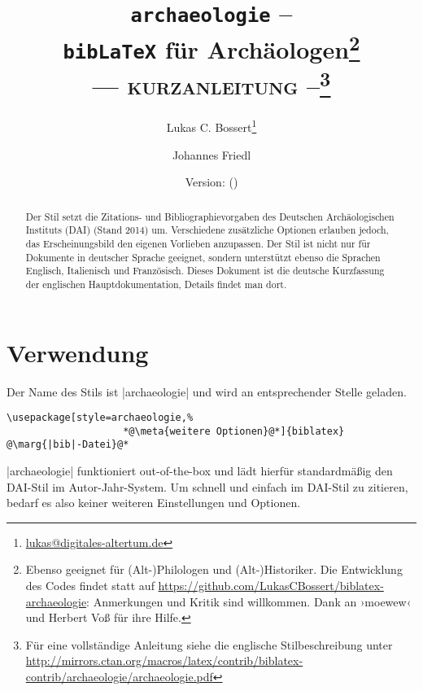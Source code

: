 \documentclass[a4paper,10pt,ngerman]{ltxdoc}
\begin{document}
 \title{\texttt{archaeologie} -- \\\texttt{bib\LaTeX} für Archäologen\footnote{Ebenso geeignet für (Alt-)Philologen und (Alt-)Historiker.
 Die Entwicklung des Codes findet statt auf \url{https://github.com/LukasCBossert/biblatex-archaeologie}: 
 Anmerkungen und Kritik sind willkommen.
 Dank an   ›moewew‹ und Herbert Voß für ihre Hilfe.
}\\ --- {\scshape kurzanleitung} --\footnote{Für eine vollständige Anleitung siehe die englische Stilbeschreibung unter \url{http://mirrors.ctan.org/macros/latex/contrib/biblatex-contrib/archaeologie/archaeologie.pdf}} }
\author{Lukas C. Bossert\thanks{\url{lukas@digitales-altertum.de}} \and Johannes Friedl}
\date{Version: \archaeologieversion{} (\archaeologiedate)} 
 
 \maketitle
 \begin{abstract}
\noindent Der Stil setzt die Zitations- und Bibliographievorgaben des Deutschen Archäologischen Instituts (DAI) (Stand 2014) um. Verschiedene zusätzliche Optionen erlauben jedoch, das Erscheinungsbild den eigenen Vorlieben anzupassen. Der Stil ist nicht nur für Dokumente in deutscher Sprache geeignet, sondern unterstützt ebenso die Sprachen Englisch, Italienisch und Französisch. Dieses Dokument ist die deutsche Kurzfassung der englischen Hauptdokumentation, Details findet man dort.

 \end{abstract}

	{\parskip=0mm \tableofcontents}
\clearpage
\section{Verwendung}
   Der Name des Stils ist |archaeologie| und wird an entsprechender Stelle geladen.

\begin{lstlisting}
\usepackage[style=archaeologie,%
					*@\meta{weitere Optionen}@*]{biblatex}
@\marg{|bib|-Datei}@*
\end{lstlisting}

|archaeologie| funktioniert out-of-the-box und lädt hierfür standardmäßig den DAI-Stil im Autor-Jahr-System. 
Um schnell und einfach im DAI-Stil zu zitieren, bedarf es also keiner weiteren Einstellungen und Optionen. 
\end{document}
